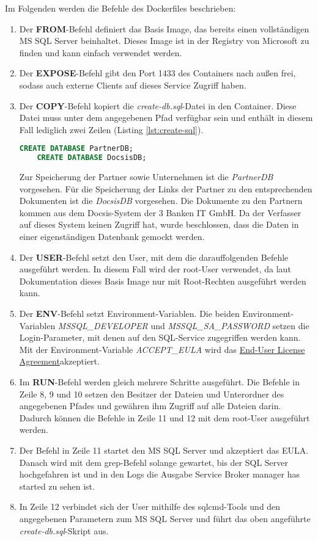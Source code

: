 Im Folgenden werden die Befehle des Dockerfiles beschrieben:
\begin{enumerate}
	\item Der \textbf{FROM}-Befehl definiert das Basis Image, das bereits einen vollständigen MS SQL Server beinhaltet. Dieses Image ist in der Registry von Microsoft zu finden und kann einfach verwendet werden.
	\item Der \textbf{EXPOSE}-Befehl gibt den Port 1433 des Containers nach außen frei, sodass auch externe Clients auf dieses Service Zugriff haben.
	\item Der \textbf{COPY}-Befehl kopiert die \textit{create-db.sql}-Datei in den Container. Diese Datei muss unter dem angegebenen Pfad verfügbar sein und enthält in diesem Fall lediglich zwei Zeilen (Listing \ref{lst:create-sql}).
\begin{lstlisting}[language=sql, caption=create-db.sql, label=lst:create-sql]
	CREATE DATABASE PartnerDB;
	CREATE DATABASE DocsisDB;
\end{lstlisting}
	Zur Speicherung der Partner sowie Unternehmen ist die \textit{PartnerDB} vorgesehen. Für die Speicherung der Links der Partner zu den entsprechenden Dokumenten ist die \textit{DocsisDB} vorgesehen. Die Dokumente zu den Partnern kommen aus dem Docsis-System der 3 Banken IT GmbH. Da der Verfasser auf dieses System keinen Zugriff hat, wurde beschlossen, dass die Daten in einer eigenständigen Datenbank gemockt werden.
	\item Der \textbf{USER}-Befehl setzt den User, mit dem die darauffolgenden Befehle ausgeführt werden. In diesem Fall wird der root-User verwendet, da laut Dokumentation dieses Basis Image nur mit Root-Rechten ausgeführt werden kann.
	\item Der \textbf{ENV}-Befehl setzt Environment-Variablen. Die beiden Environment-Variablen \textit{MSSQL\_DEVELOPER} und \textit{MSSQL\_SA\_PASSWORD} setzen die Login-Parameter, mit denen auf den SQL-Service zugegriffen werden kann. Mit der Environment-Variable \textit{ACCEPT\_EULA} wird das \glqq \href{https://documentation.commvault.com/commvault/v11/article?p=50060.htm}{End-User License Agreement}\grqq akzeptiert.
	\item Im \textbf{RUN}-Befehl werden gleich mehrere Schritte ausgeführt. Die Befehle in Zeile 8, 9 und 10 setzen den Besitzer der Dateien und Unterordner des angegebenen Pfades und gewähren ihm Zugriff auf alle Dateien darin. Dadurch können die Befehle in Zeile 11 und 12 mit dem root-User ausgeführt werden.
	\item Der Befehl in Zeile 11 startet den MS SQL Server und akzeptiert das EULA. Danach wird mit dem grep-Befehl solange gewartet, bis der SQL Server hochgefahren ist und in den Logs die Ausgabe \glqq Service Broker manager has started\grqq{} zu sehen ist.
	\item In Zeile 12 verbindet sich der User mithilfe des sqlcmd-Tools und den angegebenen Parametern zum MS SQL Server und führt das oben angeführte \textit{create-db.sql}-Skript aus.
\end{enumerate}

